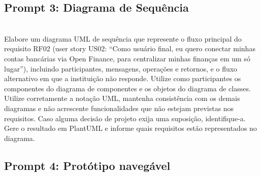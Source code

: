 \documentclass[11pt,a4paper]{article}
\begin{document}
\subsection*{Prompt 3: Diagrama de Sequência}
\begin{tcolorbox}\\
Elabore um diagrama UML de sequência que represente o fluxo principal do requisito RF02 (user story US02: “Como usuário final, eu quero conectar minhas contas bancárias via Open Finance, para centralizar minhas finanças em um só lugar”), incluindo participantes, mensagens, operações e retornos, e o fluxo alternativo em que a instituição não responde. Utilize como participantes os componentes do diagrama de componentes e os objetos do diagrama de classes. Utilize corretamente a notação UML, mantenha consistência com os demais diagramas e não acrescente funcionalidades que não estejam previstas nos requisitos. Caso alguma decisão de projeto exija uma suposição, identifique-a. Gere o resultado em PlantUML e informe quais requisitos estão representados no diagrama.
\end{tcolorbox}

\subsection*{Prompt 4: Protótipo navegável}
\end{document}
